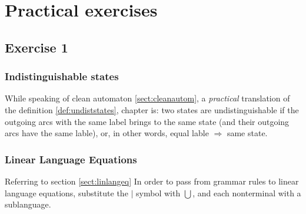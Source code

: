 \chapter{Practical exercises}
    \section{Exercise 1}
        \subsection{Indistinguishable states}
            While speaking of clean automaton \ref{sect:cleanautom}, a \emph{practical} translation of the definition \ref{def:undiststates}, chapter is: two states are 
            undistinguishable if the outgoing arcs with the same label brings to the same state (and their outgoing arcs have the same lable), or, in other words, 
            equal lable $\Rightarrow$ same state.
        \subsection{Linear Language Equations}\label{ese:linlangeq}
            Referring to section \ref{sect:linlangeq}
            In order to pass from grammar rules to linear language equations, substitute the $\vert$ symbol with $\bigcup$, and each nonterminal with a sublanguage.    